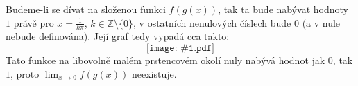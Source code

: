 \documentclass[12pt,a4paper]{article}
\def\Z{\mathbb Z}
\def\graf#1{\[\texttt{[image: \#1.pdf]}\]}
\begin{document}
Budeme-li se dívat na složenou funkci $f(g(x))$, tak ta bude nabývat hodnoty $1$ právě pro $x = \frac{1}{k\pi}$, $k \in \Z \setminus \{0\}$, v ostatních nenulových číslech bude $0$ (a v nule nebude definována). Její graf tedy vypadá cca takto:
\graf{grafy_p/mnoho_der}
Tato funkce na libovolně malém prstencovém okolí nuly nabývá hodnot jak $0$, tak $1$, proto $\lim_{x \to 0} f(g(x))$ neexistuje.
%
%
%
%
%
\end{document}
